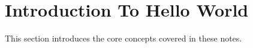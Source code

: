 \section{Introduction To Hello World}
This section introduces the core concepts covered in these notes.
